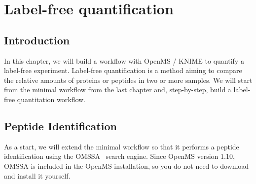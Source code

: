
\newpage
\section{Label-free quantification}
\label{sec:lfq}

\subsection{Introduction}

In this chapter, we will build a workflow with OpenMS / KNIME to quantify a label-free experiment. 
Label-free quantification is a method aiming to compare the relative amounts of proteins or peptides in two or more samples.
We will start from the minimal workflow from the last chapter and, step-by-step, build a label-free quantitation workflow.

\subsection{Peptide Identification}
\label{Peptide_Identification}

As a start, we will extend the minimal workflow so that it performs a peptide identification using the OMSSA~\cite{Geer:2004p285} search engine. Since OpenMS version 1.10, OMSSA is included in the OpenMS installation, so you do not need to download and install it yourself.


